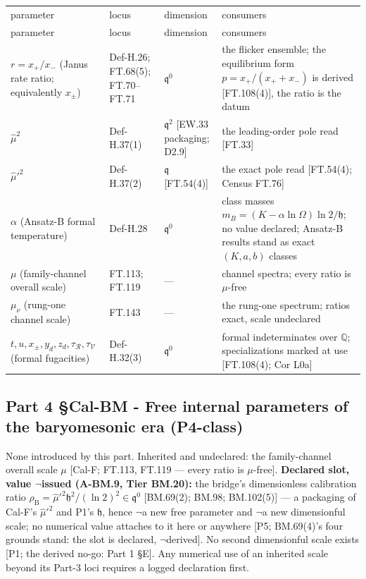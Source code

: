 \documentclass[11pt,openany]{report}
\theoremstyle{canonplain}
\theoremstyle{canondef}
\begin{document}
{\scriptsize\setlength{\tabcolsep}{4pt}
\begin{longtable}{>{\raggedright\arraybackslash}p{}|>{\raggedright\arraybackslash}p{}|>{\raggedright\arraybackslash}p{}|>{\raggedright\arraybackslash}p{}}
\toprule
parameter & locus & dimension & consumers \\
\addlinespace[2pt]
\midrule
\endfirsthead
\toprule
parameter & locus & dimension & consumers \\
\addlinespace[2pt]
\midrule
\endhead
\bottomrule
\endlastfoot
$r=\allowbreak x_+\allowbreak /x_-$ (Janus rate ratio; equivalently $x_\pm$) & Def-H.26; FT.68(5); FT.70–FT.71 & $\mathfrak q^0$ & the flicker ensemble; the equilibrium form $p=\allowbreak x_+\allowbreak /(x_+\allowbreak +\allowbreak x_-)$ is derived [FT.108(4)], the ratio is the datum \\
$\hat\mu^2$ & Def-H.37(1) & $\mathfrak q^2$ [EW.33 packaging; D2.9] & the leading-order pole read [FT.33] \\
$\hat\mu'^2$ & Def-H.37(2) & $\mathfrak q$ [FT.54(4)] & the exact pole read [FT.54(4); Census FT.76] \\
$\alpha$ (Ansatz-B formal temperature) & Def-H.28 & $\mathfrak q^0$ & class masses $m_B=\allowbreak (K-\alpha\ln\Omega)\ln2/\mathfrak h$; no value declared; Ansatz-B results stand as exact $(K,\allowbreak a,\allowbreak b)$ classes \\
$\mu$ (family-channel overall scale) & FT.113; FT.119 & — & channel spectra; every ratio is $\mu$-free \\
$\mu_\nu$ (rung-one channel scale) & FT.143 & — & the rung-one spectrum; ratios exact, scale undeclared \\
$t,\allowbreak u,\allowbreak x_\pm,\allowbreak y_d,\allowbreak z_d,\allowbreak \tau_{\mathcal R},\allowbreak \tau_{\mathcal V}$ (formal fugacities) & Def-H.32(3) & $\mathfrak q^0$ & formal indeterminates over $\mathbb Q$; specializations marked at use [FT.108(4); Cor L0a] \\
\end{longtable}
}

\subsection*{Part 4 §Cal-BM - Free internal parameters of the baryomesonic era (P4-class)}
None introduced by this part. Inherited and undeclared: the family-channel overall scale $\mu$ [Cal-F; FT.113, FT.119 — every ratio is $\mu$-free]. \textbf{Declared slot, value $\neg$issued (A-BM.9, Tier BM.20):} the bridge's dimensionless calibration ratio $\rho_{\mathrm B}=\hat\mu'^2\mathfrak h^2/(\ln2)^2\in\mathfrak q^0$ [BM.69(2); BM.98; BM.102(5)] — a packaging of Cal-F's $\hat\mu'^2$ and P1's $\mathfrak h$, hence $\neg$a new free parameter and $\neg$a new dimensionful scale; no numerical value attaches to it here or anywhere [P5; BM.69(4)'s four grounds stand: the slot is declared, $\neg$derived]. No second dimensionful scale exists [P1; the derived no-go: Part 1 §E]. Any numerical use of an inherited scale beyond its Part-3 loci requires a logged declaration first.
\end{document}
